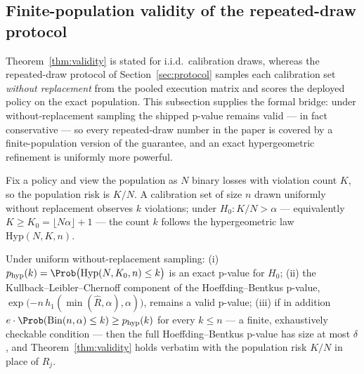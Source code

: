 \subsection{Finite-population validity of the repeated-draw protocol}
\label{app:finitepop}

Theorem~\ref{thm:validity} is stated for i.i.d.\ calibration draws,
whereas the repeated-draw protocol of Section~\ref{sec:protocol}
samples each calibration set \emph{without replacement} from the
pooled execution matrix and scores the deployed policy on the exact
population. This subsection supplies the formal bridge: under
without-replacement sampling the shipped p-value remains valid --- in
fact conservative --- so every repeated-draw number in the paper is
covered by a finite-population version of the guarantee, and an exact
hypergeometric refinement is uniformly more powerful.

Fix a policy and view the population as $N$ binary losses with
violation count $K$, so the population risk is $K/N$. A calibration
set of size $n$ drawn uniformly without replacement observes $k$
violations; under $H_0 \colon K/N > \alpha$ --- equivalently
$K \ge K_0 = \lfloor N\alpha \rfloor + 1$ --- the count $k$ follows
the hypergeometric law $\mathrm{Hyp}(N, K, n)$.

\begin{proposition}
\label{prop:finitepop}
Under uniform without-replacement sampling:
(i) $p_{\mathrm{hyp}}(k) = \Prob\big(\mathrm{Hyp}(N, K_0, n) \le
k\big)$ is an exact p-value for $H_0$;
(ii) the Kullback--Leibler--Chernoff component of the
Hoeffding--Bentkus p-value, $\exp\big({-n\, h_1(\min(\hat R, \alpha),
\alpha)}\big)$, remains a valid p-value;
(iii) if in addition $e \cdot \Prob(\mathrm{Bin}(n, \alpha) \le k)
\ge p_{\mathrm{hyp}}(k)$ for every $k \le n$ --- a finite, exhaustively
checkable condition --- then the full Hoeffding--Bentkus p-value has
size at most $\delta$, and Theorem~\ref{thm:validity} holds verbatim
with the population risk $K/N$ in place of $R_j$.
\end{proposition}

